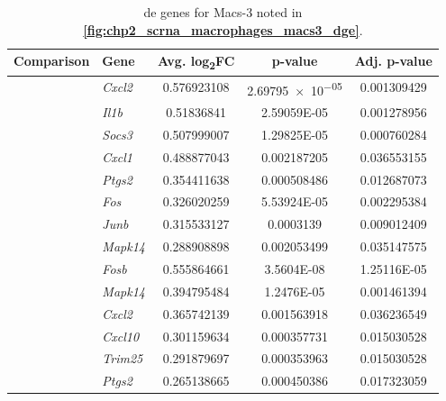 \begin{table}[ht!]
  \renewcommand{\arraystretch}{1.2} %
  \centering
 \caption[ genes in Macs-3 sub-population from  data]{\gls{de} genes for Macs-3 noted in \textbf{\autoref{fig:chp2_scrna_macrophages_macs3_dge}}.}
     \label{tab:app_scrna_macs3_dge}
  \begin{tabularx}{\textwidth}{xxCCC}
    \toprule
    \textbf{Comparison} & \textbf{Gene} & \textbf{Avg. log\textsubscript{2}FC} & \textbf{p-value} & \textbf{Adj. p-value} \\
    \midrule
     & \textit{Cxcl2} & 0.576923108 &  \num{2.69795e-05}  & \num{0.001309429} \\
     & \textit{Il1b} & 0.51836841 & \num{2.59059E-05} & 0.001278956 \\
     & \textit{Socs3} & 0.507999007 & \num{1.29825E-05} &	0.000760284 \\
     & \textit{Cxcl1} & 0.488877043 &	0.002187205 &	0.036553155 \\
     & \textit{Ptgs2} & 0.354411638 &	0.000508486 &	0.012687073 \\
     & \textit{Fos} & 0.326020259 &	\num{5.53924E-05} &	0.002295384 \\
     & \textit{Junb} & 0.315533127 &	0.0003139 &	0.009012409 \\
     & \textit{Mapk14} & 0.288908898 & 0.002053499 &	0.035147575 \\
     
     \midrule

      & \textit{Fosb} & 0.555864661 &	\num{3.5604E-08} & \num{1.25116E-05}	 \\
     & \textit{Mapk14} &	0.394795484 & \num{1.2476E-05} & 0.001461394 \\
     & \textit{Cxcl2} &	0.365742139 &	0.001563918 &	0.036236549 \\
     & \textit{Cxcl10} &	0.301159634 &	0.000357731 &	0.015030528 \\
     & \textit{Trim25} &	0.291879697 &	0.000353963 &	0.015030528 \\
     & \textit{Ptgs2} &	0.265138665 &	0.000450386 &	0.017323059 \\
     \midrule


\end{tabularx}
\end{table}
